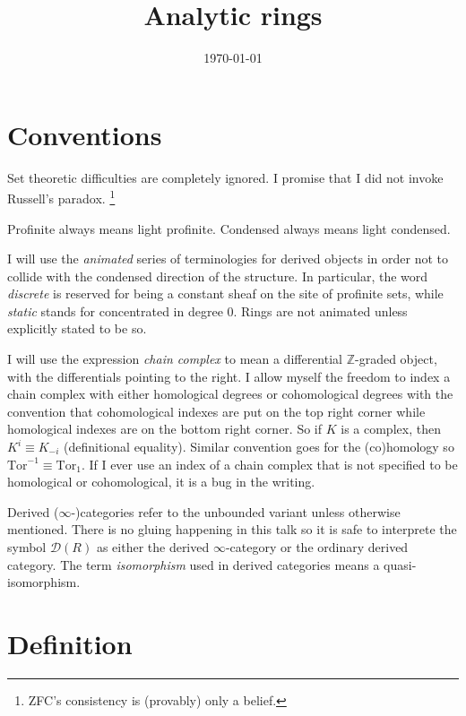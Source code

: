 \documentclass{article}
\title{Analytic rings}
\author{}
\date{\today}
\theoremstyle{plain}
\theoremstyle{definition}
\theoremstyle{remark}
\newcommand{\D}{\mathcal{D}}
\newcommand{\bullshit}[1]{\footnote{#1}}
\begin{document}
\maketitle
\tableofcontents
\pagebreak

\section*{Conventions}

Set theoretic difficulties are completely ignored.
I promise that I did not invoke Russell's paradox.
\bullshit{ZFC's consistency is (provably) only a belief.}

Profinite always means light profinite. Condensed always means light condensed.

I will use the \emph{animated} series of terminologies for derived objects in order not to collide with the condensed direction of the structure.
In particular,
the word \emph{discrete} is reserved for being a constant sheaf on the site of profinite sets, while
\emph{static} stands for concentrated in degree $ 0 $.
Rings are not animated unless explicitly stated to be so.

I will use the expression \emph{chain complex} to mean a differential $ \mathbb{Z} $-graded object, with
the differentials pointing to the right.
I allow myself the freedom to index a chain complex with either homological degrees or cohomological degrees with the convention that
cohomological indexes are put on the top right corner while homological indexes are on the bottom right corner.
So if $ K $ is a complex, then $ K ^{i} \equiv K _{-i} $ (definitional equality).
Similar convention goes for the (co)homology so $ \mathrm{Tor}^{-1}\equiv \mathrm{Tor}_{1} $.
If I ever use an index of a chain complex that is not specified to be homological or cohomological, it is a bug in the writing.

Derived ($ \infty $-)categories refer to the unbounded variant unless otherwise mentioned.
There is no gluing happening in this talk so it is safe to interprete the symbol $ \D(R) $ as either the derived $ \infty $-category
or the ordinary derived category.
The term \emph{isomorphism} used in derived categories means a quasi-isomorphism.

\pagebreak

\section{Definition}
\end{document}
